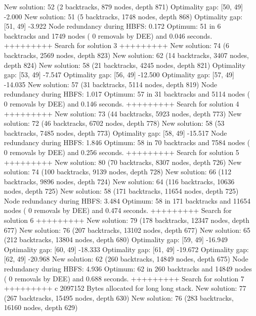 \begin{enumerate}
{\begin{DoxyCode}
New solution: 52 (2 backtracks, 879 nodes, depth 871)
Optimality gap: [50, 49] -2.000 %
New solution: 51 (5 backtracks, 1748 nodes, depth 868)
Optimality gap: [51, 49] -3.922 %
Node redundancy during HBFS: 0.172 %
Optimum: 51 in 6 backtracks and 1749 nodes ( 0 removals by DEE) and 0.046 seconds.
+++++++++ Search for solution 3 +++++++++
New solution: 74 (6 backtracks, 2569 nodes, depth 823)
New solution: 62 (14 backtracks, 3407 nodes, depth 824)
New solution: 58 (21 backtracks, 4245 nodes, depth 821)
Optimality gap: [53, 49] -7.547 %
Optimality gap: [56, 49] -12.500 %
Optimality gap: [57, 49] -14.035 %
New solution: 57 (31 backtracks, 5114 nodes, depth 819)
Node redundancy during HBFS: 1.017 %
Optimum: 57 in 31 backtracks and 5114 nodes ( 0 removals by DEE) and 0.146 seconds.
+++++++++ Search for solution 4 +++++++++
New solution: 73 (44 backtracks, 5923 nodes, depth 773)
New solution: 72 (46 backtracks, 6702 nodes, depth 778)
New solution: 58 (53 backtracks, 7485 nodes, depth 773)
Optimality gap: [58, 49] -15.517 %
Node redundancy during HBFS: 1.846 %
Optimum: 58 in 70 backtracks and 7584 nodes ( 0 removals by DEE) and 0.256 seconds.
+++++++++ Search for solution 5 +++++++++
New solution: 80 (70 backtracks, 8307 nodes, depth 726)
New solution: 74 (100 backtracks, 9139 nodes, depth 728)
New solution: 66 (112 backtracks, 9896 nodes, depth 724)
New solution: 64 (116 backtracks, 10636 nodes, depth 725)
New solution: 58 (171 backtracks, 11654 nodes, depth 725)
Node redundancy during HBFS: 3.484 %
Optimum: 58 in 171 backtracks and 11654 nodes ( 0 removals by DEE) and 0.474 seconds.
+++++++++ Search for solution 6 +++++++++
New solution: 79 (178 backtracks, 12347 nodes, depth 677)
New solution: 76 (207 backtracks, 13102 nodes, depth 677)
New solution: 65 (212 backtracks, 13804 nodes, depth 680)
Optimality gap: [59, 49] -16.949 %
Optimality gap: [60, 49] -18.333 %
Optimality gap: [61, 49] -19.672 %
Optimality gap: [62, 49] -20.968 %
New solution: 62 (260 backtracks, 14849 nodes, depth 675)
Node redundancy during HBFS: 4.936 %
Optimum: 62 in 260 backtracks and 14849 nodes ( 0 removals by DEE) and 0.688 seconds.
+++++++++ Search for solution 7 +++++++++
c 2097152 Bytes allocated for long long stack.
New solution: 77 (267 backtracks, 15495 nodes, depth 630)
New solution: 76 (283 backtracks, 16160 nodes, depth 629)

\end{DoxyCode}}
\end{enumerate}
